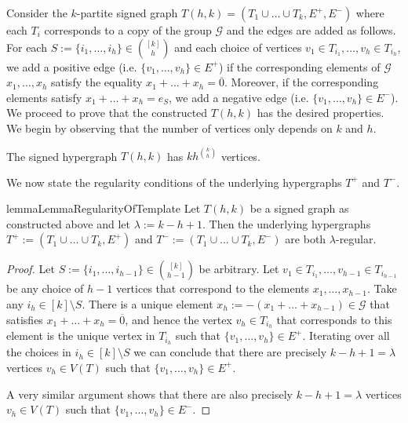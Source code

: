 \documentclass[a4paper,UKenglish,cleveref, autoref, thm-restate,numberwithinsect]{lipics-v2021}
\newcommand{\G}{\mathcal{G}}
\newcommand{\reg}{\lambda}
\begin{document}
Consider the $k$-partite signed graph $T(h,k) = (T_1\cup\dots \cup T_k, E^+,E^-)$ where each $T_i$ corresponds to a copy of the group $\G$ and the edges are added as follows.
For each $S:=\{i_1,\dots, i_h\}\in \binom{[k]}{h}$ and each choice of vertices $v_1\in T_{i_1},\dots, v_h\in T_{i_h}$, we add a positive edge (i.e. $\{v_1,\dots, v_h\}\in E^+$) if the corresponding elements of $\G$ $x_1,\dots, x_h$ satisfy the equality $x_1+\dots + x_h = \overline 0$.
Moreover, if the corresponding elements satisfy $x_1+\dots + x_h = e_S$, we add a negative edge (i.e. $\{v_1,\dots, v_h\}\in E^-$).
We proceed to prove that the constructed $T(h,k)$ has the desired properties. We begin by observing that the number of vertices only depends on $k$ and $h$.
\begin{observation}\label{obs:template-graph-clique}
    The signed hypergraph $T(h,k)$ has $kh^{\binom k h}$ vertices.
\end{observation}
We now state the regularity conditions of the underlying hypergraphs $T^+$ and $T^-$.
\begin{restatable}{lemma}{LemmaRegularityOfTemplate}\label{lemma:lambda-regularity-of-T}
    Let $T(h,k)$ be a signed graph as constructed above and let $\reg := k-h+1$. Then the underlying hypergraphs $T^+ := (T_1\cup\dots\cup T_k, E^+)$ and $T^-:=(T_1\cup\dots\cup T_k, E^-)$ are both $\reg$-regular.
\end{restatable}
\begin{proof}
    Let $S:=\{i_1,\dots, i_{h-1}\}\in \binom{[k]}{h-1}$ be arbitrary. Let $v_1\in T_{i_1},\dots, v_{h-1}\in T_{i_{h-1}}$ be any choice of $h-1$ vertices that correspond to the elements $x_1,\dots, x_{h-1}$. 
    Take any $i_h\in [k]\setminus S$. There is a unique element $x_h:=-(x_1+\dots + x_{h-1}) \in \G$ that satisfies $x_1+\dots+x_h = \overline{0}$, and hence the vertex $v_h\in T_{i_h}$ that corresponds to this element is the unique vertex in $T_{i_h}$ such that $\{v_1,\dots, v_h\}\in E^+$.
    Iterating over all the choices in $i_h\in [k]\setminus S$ we can conclude that there are precisely $k-h+1 = \reg$ vertices $v_h\in V(T)$ such that $\{v_1,\dots, v_h\}\in E^+$.
    
    A very similar argument shows that there are also precisely $k-h+1 = \reg$ vertices $v_h\in V(T)$ such that $\{v_1,\dots, v_h\}\in E^-$.
\end{proof}
\end{document}
